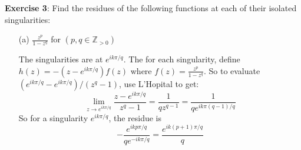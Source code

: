 \documentclass{article}
\begin{document}
\textbf{Exercise 3}: Find the residues of the following functions at each of their isolated singularities:
    \begin{itemize}
        \item [(a)] $\frac{z^{p}}{1 - z^{q}}$ for $(p, q \in \mathbb{Z}_{> 0})$
            \begin{answer}
                The singularities are at $e^{ik\pi/q}$. The for each singularity, define $h(z) = -(z - e^{ik\pi/q})f(z)$ where $f(z) = \frac{z^{p}}{1 - z^{q}}$. So to evaluate $(e^{ik\pi/q} - e^{ik\pi/q})/(z^{q} - 1)$, use L'Hopital to get:
                    \begin{equation*}
                        \lim\limits_{z \to e^{ik\pi/q}}\dfrac{z - e^{ik\pi/q}}{z^{q} - 1} = \dfrac{1}{qz^{q - 1}} = \dfrac{1}{qe^{ik\pi(q - 1)/q}}
                    \end{equation*}
                So for a singularity $e^{ik\pi/q}$, the residue is 
                    \begin{equation*}
                        -\dfrac{e^{ikp\pi/q}}{qe^{-ik\pi/q}} = \dfrac{e^{ik(p + 1)\pi/q}}{q}
                    \end{equation*}
            \end{answer}


\end{itemize}
\end{document}
